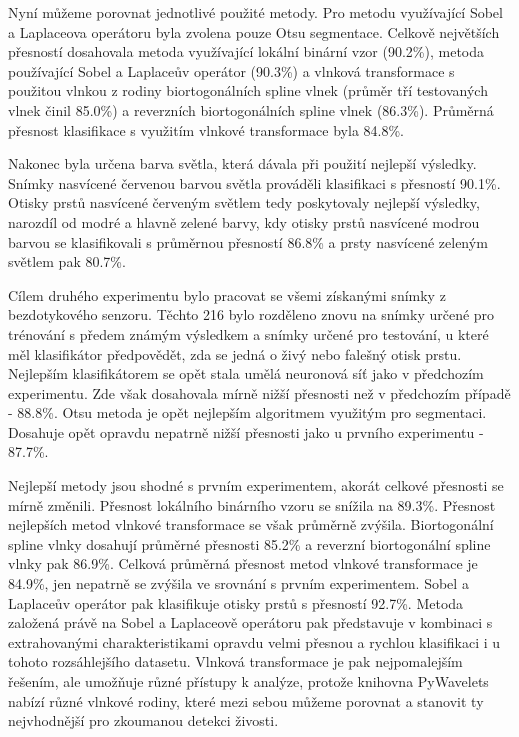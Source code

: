 Nyní můžeme porovnat jednotlivé použité metody. Pro metodu využívající Sobel a Laplaceova operátoru byla zvolena pouze Otsu segmentace. Celkově největších přesností dosahovala metoda využívající lokální binární vzor (90.2\%), metoda používající Sobel a Laplaceův operátor (90.3\%) a vlnková transformace s použitou vlnkou z rodiny biortogonálních spline vlnek (průměr tří testovaných vlnek činil 85.0\%) a reverzních biortogonálních spline vlnek (86.3\%). Průměrná přesnost klasifikace s využitím vlnkové transformace byla 84.8\%.

Nakonec byla určena barva světla, která dávala při použití nejlepší výsledky. Snímky nasvícené červenou barvou světla prováděli klasifikaci s přesností 90.1\%. Otisky prstů nasvícené červeným světlem tedy poskytovaly nejlepší výsledky, narozdíl od modré a hlavně zelené barvy, kdy otisky prstů nasvícené modrou barvou se klasifikovali s průměrnou přesností 86.8\% a prsty nasvícené zeleným světlem pak 80.7\%.

Cílem druhého experimentu bylo pracovat se všemi získanými snímky z bezdotykového senzoru. Těchto 216 bylo rozděleno znovu na snímky určené pro trénování s předem známým výsledkem a snímky určené pro testování, u které měl klasifikátor předpovědět, zda se jedná o živý nebo falešný otisk prstu. Nejlepším klasifikátorem se opět stala umělá neuronová síť jako v předchozím experimentu. Zde však dosahovala mírně nižší přesnosti než v předchozím případě - 88.8\%. Otsu metoda je opět nejlepším algoritmem využitým pro segmentaci. Dosahuje opět opravdu nepatrně nižší přesnosti jako u prvního experimentu - 87.7\%. 

Nejlepší metody jsou shodné s prvním experimentem, akorát celkové přesnosti se mírně změnili. Přesnost lokálního binárního vzoru se snížila na 89.3\%. Přesnost nejlepších metod vlnkové transformace se však průměrně zvýšila. Biortogonální spline vlnky dosahují průměrné přesnosti 85.2\% a reverzní biortogonální spline vlnky pak 86.9\%. Celková průměrná přesnost metod vlnkové transformace je 84.9\%, jen nepatrně se zvýšila ve srovnání s prvním experimentem. Sobel a Laplaceův operátor pak klasifikuje otisky prstů s přesností 92.7\%. Metoda založená právě na Sobel a Laplaceově operátoru pak představuje v kombinaci s extrahovanými charakteristikami opravdu velmi přesnou a rychlou klasifikaci i u tohoto rozsáhlejšího datasetu. Vlnková transformace je pak nejpomalejším řešením, ale umožňuje různé přístupy k analýze, protože knihovna PyWavelets nabízí různé vlnkové rodiny, které mezi sebou můžeme porovnat a stanovit ty nejvhodnější pro zkoumanou detekci živosti.

